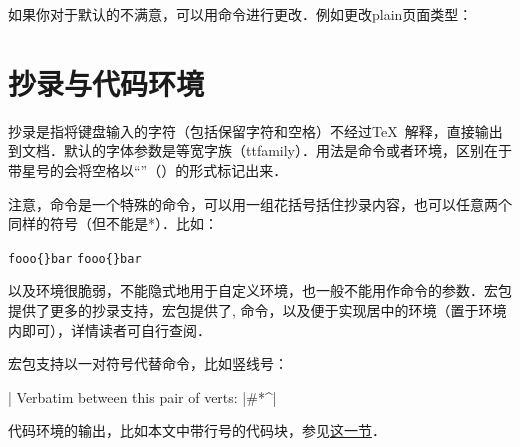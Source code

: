 如果你对于默认的不满意，可以用命令进行更改．例如更改plain页面类型：
\begin{latex}
\end{latex}

\section{抄录与代码环境}
抄录是指将键盘输入的字符（包括保留字符和空格）不经过\TeX\ 解释，直接输出到文档．默认的字体参数是等宽字族（ttfamily）．用法是命令或者环境，区别在于带星号的会将空格以“\textvisiblespace”（）的形式标记出来．

注意，命令是一个特殊的命令，可以用一组花括号括住抄录内容，也可以任意两个同样的符号（但不能是*）．比如：
\begin{latex}
\verb|fooo{}bar|
\verb+fooo{}bar+
\end{latex}

以及环境很脆弱，不能隐式地用于自定义环境，也一般不能用作命令的参数．宏包提供了更多的抄录支持，宏包提供了, 命令，以及便于实现居中的环境（置于环境内即可），详情读者可自行查阅．

宏包支持以一对符号代替命令，比如竖线号：
\begin{latex}
\MakeShortVerb|
Verbatim between this pair of verts: |#\?*^|
\end{latex}

代码环境的输出，比如本文中带行号的代码块，参见\hyperref[sec:coding]{这一节}．

